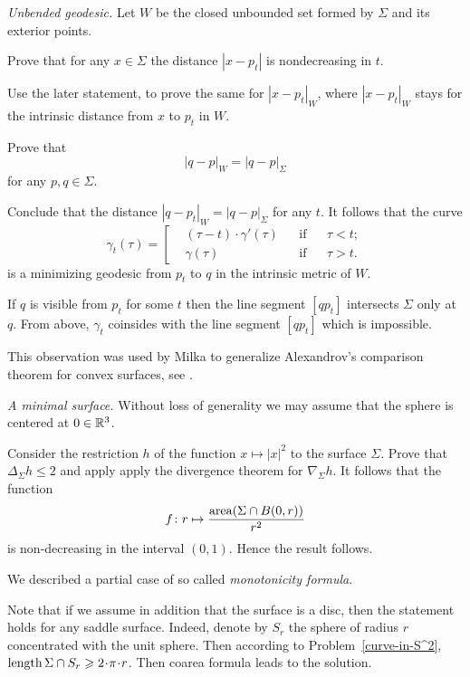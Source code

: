  



\textit{Unbended geodesic.}
Let $W$ be the closed unbounded set formed by $\Sigma$ and its exterior points.

Prove that for any $x\in\Sigma$ the distance $|x - p_t|$ is nondecreasing in $t$.

Use the later statement, to prove the same for $|x - p_t|_W$,
where $|x - p_t|_W$ stays for the intrinsic distance from $x$ to $p_t$ in $W$.

Prove that 
\[|q - p|_W=|q - p|_\Sigma\] 
for any $p,q\in\Sigma$.


Conclude that the distance $|q - p_t|_W=|q - p|_\Sigma$
for any $t$.
It follows that the curve 
$$\gamma_t(\tau)=\left[
\begin{aligned}
&(\tau-t)\cdot\gamma'(\tau)&&\text{if}&&\tau< t;
\\
&\gamma(\tau)&&\text{if}&&\tau> t.
\end{aligned}
\right.$$
is a minimizing geodesic from $p_t$ to $q$ in the intrinsic metric of $W$. 

If $q$ is visible from $p_t$ for some $t$ then the line segment $[qp_t]$ intersects $\Sigma$ only at $q$.
From above, 
$\gamma_t$  coinsides with the line segment $[qp_t]$ which is impossible.

This  observation was used by Milka
to generalize Alexandrov's comparison theorem for convex surfaces, see \cite{milka-geod}.

\textit{A minimal surface.}
Without loss of generality we may assume that the sphere is centered at $0\in\mathbb{R}^3$.

Consider the restriction $h$ of the function $x\mapsto |x|^2$ to the surface $\Sigma$.
Prove that $\Delta_\Sigma h\le 2$ and apply apply the divergence theorem for $\nabla_\Sigma h$.
It follows that the function
\[f\colon r\mapsto \frac{\operatorname{\rm area}(\Sigma\cap B(0,r))}{r^2}
\]
is non-decreasing in the interval $(0,1)$.
Hence the result follows.

We described a partial case of so called \emph{monotonicity formula}.

Note that if we assume in addition that the surface is a disc,
then the statement holds for any saddle surface. 
Indeed, denote by $S_r$ the sphere of radius $r$ concentrated with the unit sphere. 
Then according to Problem~\ref{curve-in-S^2}, 
$\length \Sigma\cap S_r\ge 2\cdot\pi\cdot r$.
Then coarea formula leads to the solution.

